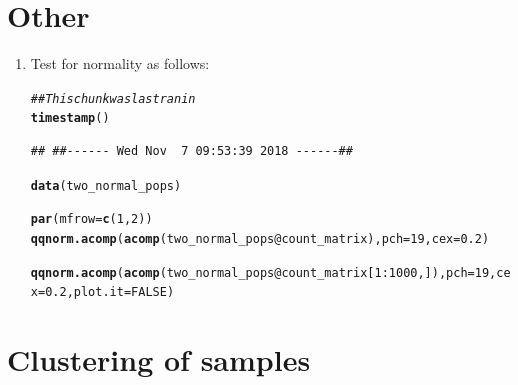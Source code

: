 \documentclass{article}\usepackage[]{graphicx}\usepackage[]{color}
\makeatletter
\newcommand{\hlnum}[1]{\textcolor[rgb]{0.686,0.059,0.569}{#1}}%
\newcommand{\hlcom}[1]{\textcolor[rgb]{0.678,0.584,0.686}{\textit{#1}}}%
\newcommand{\hlopt}[1]{\textcolor[rgb]{0,0,0}{#1}}%
\newcommand{\hlstd}[1]{\textcolor[rgb]{0.345,0.345,0.345}{#1}}%
\newcommand{\hlkwc}[1]{\textcolor[rgb]{0.333,0.667,0.333}{#1}}%
\newcommand{\hlkwd}[1]{\textcolor[rgb]{0.737,0.353,0.396}{\textbf{#1}}}%
\newenvironment{kframe}{%
 \def\at@end@of@kframe{}%
 \ifinner\ifhmode%
  \def\at@end@of@kframe{\end{minipage}}%
  \begin{minipage}{\columnwidth}%
 \fi\fi%
 \def\FrameCommand##1{\hskip\@totalleftmargin \hskip-\fboxsep
 \colorbox{shadecolor}{##1}\hskip-\fboxsep
     \hskip-\linewidth \hskip-\@totalleftmargin \hskip\columnwidth}%
 \MakeFramed {\advance\hsize-\width
   \@totalleftmargin\z@ \linewidth\hsize
   \@setminipage}}%
 {\par\unskip\endMakeFramed%
 \at@end@of@kframe}
\newenvironment{knitrout}{}{} %
\makeatother
\begin{document}
\section{Other}
\begin{enumerate}
\item Test for normality as follows:
\begin{knitrout}
\color{fgcolor}\begin{kframe}
\begin{alltt}
\hlcom{## This chunk was last ran in}
\hlkwd{timestamp}\hlstd{()}
\end{alltt}
\begin{verbatim}
## ##------ Wed Nov  7 09:53:39 2018 ------##
\end{verbatim}
\begin{alltt}
\hlkwd{data}\hlstd{(two_normal_pops)}
\end{alltt}


{\ttfamily\noindent\color{warningcolor}{\#\# Warning in data(two\_normal\_pops): data set 'two\_normal\_pops' not found}}\begin{alltt}
\hlkwd{par}\hlstd{(}\hlkwc{mfrow}\hlstd{=}\hlkwd{c}\hlstd{(}\hlnum{1}\hlstd{,}\hlnum{2}\hlstd{))}
\hlkwd{qqnorm.acomp}\hlstd{(}\hlkwd{acomp}\hlstd{(two_normal_pops}\hlopt{@}\hlkwc{count_matrix}\hlstd{),} \hlkwc{pch}\hlstd{=}\hlnum{19}\hlstd{,} \hlkwc{cex}\hlstd{=}\hlnum{0.2}\hlstd{)}
\end{alltt}


{\ttfamily\noindent\bfseries\color{errorcolor}{\#\# Error in acomp(two\_normal\_pops@count\_matrix): object 'two\_normal\_pops' not found}}\begin{alltt}
\hlkwd{qqnorm.acomp}\hlstd{(}\hlkwd{acomp}\hlstd{(two_normal_pops}\hlopt{@}\hlkwc{count_matrix}\hlstd{[}\hlnum{1}\hlopt{:}\hlnum{1000}\hlstd{,]),} \hlkwc{pch}\hlstd{=}\hlnum{19}\hlstd{,} \hlkwc{cex}\hlstd{=}\hlnum{0.2}\hlstd{,} \hlkwc{plot.it}\hlstd{=}\hlnum{FALSE}\hlstd{)}
\end{alltt}


{\ttfamily\noindent\bfseries\color{errorcolor}{\#\# Error in acomp(two\_normal\_pops@count\_matrix[1:1000, ]): object 'two\_normal\_pops' not found}}\end{kframe}
\end{knitrout}
\end{enumerate}

\section{Clustering of samples}
\end{document}
